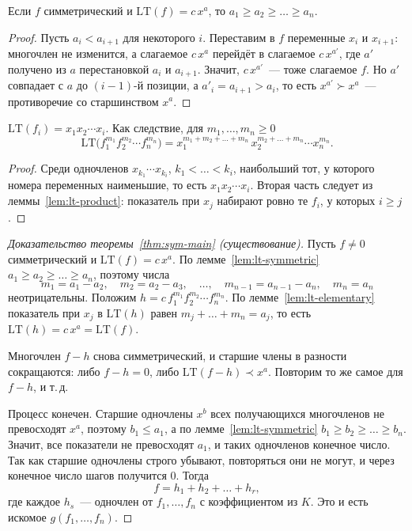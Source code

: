 \documentclass[12pt]{article}
\begin{document}
    \begin{lemma}\label{lem:lt-symmetric}
    	Если $f$ симметрический и $\mathrm{LT}(f) = c\,x^a$, то $a_1 \geqslant a_2 \geqslant \dots \geqslant a_n$.
    \end{lemma}

    \begin{proof}
    	Пусть $a_i < a_{i+1}$ для некоторого $i$. Переставим в $f$ переменные $x_i$ и $x_{i+1}$: многочлен не изменится, а слагаемое $c\,x^a$ перейдёт в слагаемое $c\,x^{a'}$, где $a'$ получено из $a$ перестановкой $a_i$ и $a_{i+1}$. Значит, $c\,x^{a'}$~--- тоже слагаемое $f$. Но $a'$ совпадает с $a$ до $(i-1)$-й позиции, а $a'_i = a_{i+1} > a_i$, то есть $x^{a'} \succ x^a$~--- противоречие со старшинством $x^a$.
    \end{proof}

    \begin{lemma}\label{lem:lt-elementary}
    	$\mathrm{LT}(f_i) = x_1 x_2 \cdots x_i$. Как следствие, для $m_1, \dots, m_n \geqslant 0$
    	\[
    		\mathrm{LT}\bigl(f_1^{m_1} f_2^{m_2} \cdots f_n^{m_n}\bigr) = x_1^{m_1 + m_2 + \dots + m_n}\, x_2^{m_2 + \dots + m_n} \cdots x_n^{m_n}.
    	\]
    \end{lemma}

    \begin{proof}
    	Среди одночленов $x_{k_1} \cdots x_{k_i}$, $k_1 < \dots < k_i$, наибольший тот, у которого номера переменных наименьшие, то есть $x_1 x_2 \cdots x_i$. Вторая часть следует из леммы~\ref{lem:lt-product}: показатель при $x_j$ набирают ровно те $f_i$, у которых $i \geqslant j$.
    \end{proof}

    \begin{proof}[Доказательство теоремы~\ref{thm:sym-main} (существование)]
    	Пусть $f \ne 0$ симметрический и $\mathrm{LT}(f) = c\,x^a$. По лемме~\ref{lem:lt-symmetric} $a_1 \geqslant a_2 \geqslant \dots \geqslant a_n$, поэтому числа
    	\[
    		m_1 = a_1 - a_2, \quad m_2 = a_2 - a_3, \quad \dots, \quad m_{n-1} = a_{n-1} - a_n, \quad m_n = a_n
    	\]
    	неотрицательны. Положим $h = c\,f_1^{m_1} f_2^{m_2} \cdots f_n^{m_n}$. По лемме~\ref{lem:lt-elementary} показатель при $x_j$ в $\mathrm{LT}(h)$ равен $m_j + \dots + m_n = a_j$, то есть $\mathrm{LT}(h) = c\,x^a = \mathrm{LT}(f)$.

    	Многочлен $f - h$ снова симметрический, и старшие члены в разности сокращаются: либо $f - h = 0$, либо $\mathrm{LT}(f - h) \prec x^a$. Повторим то же самое для $f - h$, и т.\,д.

    	Процесс конечен. Старшие одночлены $x^b$ всех получающихся многочленов не превосходят $x^a$, поэтому $b_1 \leqslant a_1$, а по лемме~\ref{lem:lt-symmetric} $b_1 \geqslant b_2 \geqslant \dots \geqslant b_n$. Значит, все показатели не превосходят $a_1$, и таких одночленов конечное число. Так как старшие одночлены строго убывают, повторяться они не могут, и через конечное число шагов получится $0$. Тогда
    	\[
    		f = h_1 + h_2 + \dots + h_r,
    	\]
    	где каждое $h_s$~--- одночлен от $f_1, \dots, f_n$ с коэффициентом из $K$. Это и есть искомое $g(f_1, \dots, f_n)$.
    \end{proof}
\end{document}
